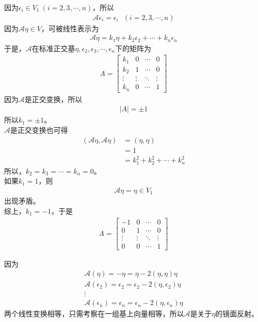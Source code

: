 \documentclass{article}
\begin{document}
因为$\epsilon_i \in V_{1} \ (i = 2, 3, \cdots, n)$，所以
\begin{align*}
  \mathscr{A} \epsilon_i = \epsilon_i \ \ \ (i = 2, 3, \cdots, n)
\end{align*}
因为$\mathscr{A}\eta \in V$，可被线性表示为
\begin{align*}
  \mathscr{A}\eta = k_1 \eta + k_2 \epsilon_2 + \cdots + k_n \epsilon_n
\end{align*}
于是，$\mathscr{A}$在标准正交基$\eta, \epsilon_2, \epsilon_3, \cdots, \epsilon_n$下的矩阵为
\begin{align*}
  A = \begin{bmatrix}
        k_1    & 0      & \cdots & 0      \\
        k_2    & 1      & \cdots & 0      \\
        \vdots & \vdots & \ddots & \vdots \\
        k_n    & 0      & \cdots & 1
      \end{bmatrix}
\end{align*}
因为$\mathscr{A}$是正交变换，所以
\begin{align*}
  |A| = \pm 1
\end{align*}
所以$k_1 = \pm 1$。\\
$\mathscr{A}$是正交变换也可得
\begin{align*}
  (\mathscr{A} \eta, \mathscr{A}\eta)
   & = (\eta, \eta)                   \\
   & = 1                              \\
   & = k_1^2 + k_2^2 + \cdots + k_n^2
\end{align*}
所以，$k_2 = k_3 = \cdots = k_n = 0$。\\
如果$k_1 = 1$，则
\begin{align*}
  \mathscr{A} \eta = \eta \in V_1
\end{align*}
出现矛盾。\\
综上，$k_1 = -1$，于是
\begin{align*}
  A = \begin{bmatrix}
        -1     & 0      & \cdots & 0      \\
        0      & 1      & \cdots & 0      \\
        \vdots & \vdots & \ddots & \vdots \\
        0      & 0      & \cdots & 1
      \end{bmatrix}
\end{align*}

因为
\begin{align*}
  \mathscr{A}(\eta) = -\eta = \eta - 2(\eta,\eta) \eta                        \\
  \mathscr{A}(\epsilon_2) = \epsilon_2 = \epsilon_2 - 2(\eta,\epsilon_2) \eta \\
  \vdots                                                                      \\
  \mathscr{A}(\epsilon_n) = \epsilon_n = \epsilon_n - 2(\eta,\epsilon_n) \eta
\end{align*}
两个线性变换相等，只需考察在一组基上向量相等，所以$\mathscr{A}$是关于$\eta$的镜面反射。
\end{document}
